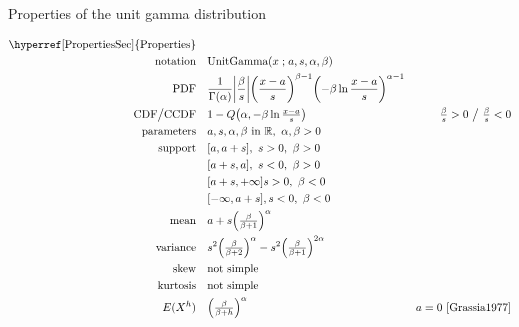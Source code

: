 

\begin{table*}[t!]
\caption[Unit gamma distribution -- Properties]{Properties of the unit gamma distribution}
\begin{align*}
\text{\hyperref[PropertiesSec]{Properties}}  \quad& \\
\text{notation} \quad & \text{UnitGamma}(x\given a,s,\alpha,\beta) 
\\
\text{PDF}\quad &  \frac{1}{\Gamma(\alpha)} \Left|\frac{\beta}{ s}\Right|
\Left(\frac{x-a}{s}\Right)^{\beta-1} \Left(-\beta \ln   \frac{x-a}{s} \Right)^{\alpha-1} \checked
\\
\text{CDF} \big/ \text{CCDF}  \quad  & 1-Q\Left(\alpha, -\beta \ln \tfrac{x-a}{s} \Right)
& \tfrac{\beta}{s}  >0 \ \big{/} \ \tfrac{\beta}{s}<0   \checked
\\
\text{parameters}\quad &   a, s,\alpha,\beta \text{ in } \Real  ,\  \alpha, \beta>0
\\
\text{support}\checked \quad 
	&   [a,a+s] ,\ s>0,\ \beta>0 \\
	&  [a+s,a], \ s<0,\ \beta>0 \\
	& [a+s,+\infty]  s>0,\ \beta<0  \\
 	& [-\infty,a+s], s<0,\ \beta<0 \\
\text{mean} \quad  &  a + s \Left(\tfrac{\beta}{\beta+1} \Right)^{\alpha} \checked
\\
\text{variance} \quad  & s^2 \Left(\tfrac{\beta}{\beta+2} \Right)^{\alpha} - s^2 \Left(\tfrac{\beta}{\beta+1} \Right)^{2\alpha} \checked
\\
\text{skew} \quad  &   \text{not simple}
\\
\text{kurtosis} \quad  &   \text{not simple}
\\
E(X^h) \quad & \Left(\tfrac{\beta}{\beta+h} \Right)^{\alpha} \qquad  & a=0 \
\text{\cite{Grassia1977}} \checked
\end{align*}
\end{table*}